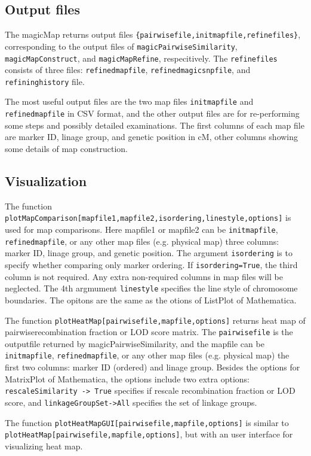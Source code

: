 \documentclass[12pt]{article}
\begin{document}
\subsection{Output files}

The magicMap returns output files \verb|{pairwisefile,initmapfile,refinefiles}|, corresponding to the output files of \verb|magicPairwiseSimilarity|, \verb|magicMapConstruct|, and \verb|magicMapRefine|, respecitively.  The \verb|refinefiles| consists of three files: \verb|refinedmapfile|, \verb|refinedmagicsnpfile|, and \verb|refininghistory| file. 

The most useful output files are the two map files \verb|initmapfile| and \verb|refinedmapfile| in CSV format, and the other output files are for re-performing some steps and possibly detailed examinations.
The first columns of each map file are marker ID, linage group, and genetic position in cM, other columns showing some details of map construction. 

\subsection{Visualization}

The function \verb|plotMapComparison[mapfile1,mapfile2,isordering,linestyle,options]| is used for map comparisons. Here mapfile1 or mapfile2 can be \verb|initmapfile|, \verb|refinedmapfile|, or any other map files (e.g. physical map) three columns: marker ID, linage group, and genetic position. The argument \verb|isordering| is to specify whether comparing only marker ordering. If \verb|isordering=True|, the third column is not required. Any extra non-required columns in map files will be neglected. The 4th argmument \verb|linestyle| specifies the line style of chromosome boundaries. The opitons are the same as the otions of ListPlot of Mathematica. 

The function \verb|plotHeatMap[pairwisefile,mapfile,options]| returns heat map of pairwiserecombination fraction or LOD score matrix. The \verb|pairwisefile| is the outputfile returned by magicPairwiseSimilarity, and the mapfile can be \verb|initmapfile|, \verb|refinedmapfile|, or any other map files (e.g. physical map) the first two columns: marker ID (ordered) and linage group. Besides the options for MatrixPlot of Mathematica, the options include two extra options: \verb|rescaleSimilarity -> True| specifies if rescale recombination fraction or LOD score, and \verb|linkageGroupSet->All| specifies the set of linkage groups. 

The function \verb|plotHeatMapGUI[pairwisefile,mapfile,options]| is similar to\\ \verb|plotHeatMap[pairwisefile,mapfile,options]|, but with an user interface for visualizing heat map. 

%
%
\end{document}
